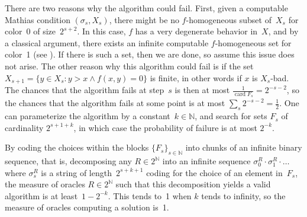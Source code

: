 \documentclass{article}
\numberwithin{theorem}{section}
\newcommand{\cs}{2^{\NN}}
\newcommand{\NN}[0]{\mathbb{N}}
\newcommand{\card}{\operatorname{card}}
\begin{document}
There are two reasons why the algorithm could fail. First, given a computable Mathias condition $(\sigma_s, X_s)$, there might be no $f$-homogeneous subset of~$X_s$ for color~0 of size~$2^{s+2}$. In this case, $f$ has a very degenerate behavior in~$X$, and by a classical argument, there exists an infinite computable $f$-homogeneous set for color~1 (see ). If there is such a set, then we are done, so assume this issue does not arise. The other reason why this algorithm could fail is if the set $X_{s+1} = \{ y \in X_s : y > x \wedge f(x, y) = 0 \}$ is finite, in other words if $x$ is $X_s$-bad. The chances that the algorithm fails at step~$s$ is then at most $\frac{1}{\card F_s} = 2^{-s-2}$, so the chances that the algorithm fails at some point is at most $\sum_s 2^{-s-2} = \frac{1}{2}$. One can parameterize the algorithm by a constant~$k \in \NN$, and search for sets $F_s$ of cardinality $2^{s+1+k}$, in which case the probability of failure is at most $2^{-k}$.


By coding the choices within the blocks $\{F_s\}_{s \in \NN}$ into chunks of an infinite binary sequence, that is, decomposing any $R \in \cs$ into an infinite sequence $\sigma^R_0 \cdot \sigma^R_1 \cdot \dots$ where $\sigma^R_s$ is a string of length~$2^{s+k+1}$ coding for the choice of an element in~$F_s$, the measure of oracles $R \in \cs$ such that this decomposition yields a valid algorithm is at least~$1-2^{-k}$.  This tends to~1 when $k$ tends to infinity, so the measure of oracles computing a solution is~1.
\end{document}
